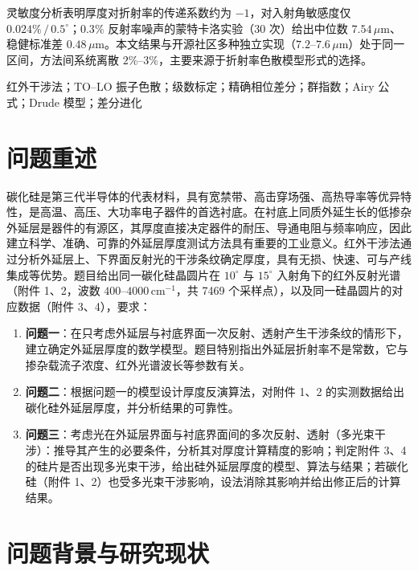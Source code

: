 \documentclass[11pt,a4paper,fontset=fandol]{ctexart}
\newcommand{\um}{\,\mu\mathrm{m}}
\newcommand{\invcm}{\,\mathrm{cm^{-1}}}
\begin{document}
灵敏度分析表明厚度对折射率的传递系数约为 $-1$，对入射角敏感度仅 $0.024\%\,/\,0.5^\circ$；$0.3\%$ 反射率噪声的蒙特卡洛实验（30 次）给出中位数 $7.54\um$、稳健标准差 $0.48\um$。本文结果与开源社区多种独立实现（$7.2\text{--}7.6\um$）处于同一区间，方法间系统离散 $2\%\text{--}3\%$，主要来源于折射率色散模型形式的选择。

\vspace{0.6em}
红外干涉法；TO--LO 振子色散；级数标定；精确相位差分；群指数；Airy 公式；Drude 模型；\mbox{差分进化}

\newpage

\section{问题重述}

碳化硅是第三代半导体的代表材料，具有宽禁带、高击穿场强、高热导率等优异特性，是高温、高压、大功率电子器件的首选衬底。在衬底上同质外延生长的低掺杂外延层是器件的有源区，其厚度直接决定器件的耐压、导通电阻与频率响应，因此建立科学、准确、可靠的外延层厚度测试方法具有重要的工业意义。红外干涉法通过分析外延层上、下界面反射光的干涉条纹确定厚度，具有无损、快速、可与产线集成等优势。题目给出同一碳化硅晶圆片在 $10^\circ$ 与 $15^\circ$ 入射角下的红外反射光谱（附件 1、2，波数 $400\text{--}4000\invcm$，共 7469 个采样点），以及同一硅晶圆片的对应数据（附件 3、4），要求：

\begin{enumerate}[label=（\arabic*）, leftmargin=2.4em, itemsep=0.1em]
    \item \textbf{问题一}：在只考虑外延层与衬底界面一次反射、透射产生干涉条纹的情形下，建立确定外延层厚度的数学模型。题目特别指出外延层折射率不是常数，它与掺杂载流子浓度、红外光谱波长等参数有关。
    \item \textbf{问题二}：根据问题一的模型设计厚度反演算法，对附件 1、2 的实测数据给出碳化硅外延层厚度，并分析结果的可靠性。
    \item \textbf{问题三}：考虑光在外延层界面与衬底界面间的多次反射、透射（多光束干涉）：推导其产生的必要条件，分析其对厚度计算精度的影响；判定附件 3、4 的硅片是否出现多光束干涉，给出硅外延层厚度的模型、算法与结果；若碳化硅（附件 1、2）也受多光束干涉影响，设法消除其影响并给出修正后的计算结果。
\end{enumerate}

\section{问题背景与研究现状}
\end{document}
